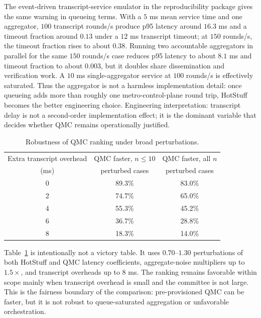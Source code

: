 \documentclass{ieeeaccess}
\begin{document}
The event-driven transcript-service emulator in the reproducibility package gives the same warning in queueing terms. With a $5$ ms mean service time and one aggregator, $100$ transcript rounds/s produce p95 latency around $16.3$ ms and a timeout fraction around $0.13$ under a $12$ ms transcript timeout; at $150$ rounds/s, the timeout fraction rises to about $0.38$. Running two accountable aggregators in parallel for the same $150$ rounds/s case reduces p95 latency to about $8.1$ ms and timeout fraction to about $0.003$, but it doubles share dissemination and verification work. A $10$ ms single-aggregator service at $100$ rounds/s is effectively saturated. Thus the aggregator is not a harmless implementation detail: once queueing adds more than roughly one metro-control-plane round trip, HotStuff becomes the better engineering choice. Engineering interpretation: transcript delay is not a second-order implementation effect; it is the dominant variable that decides whether QMC remains operationally justified.

\begin{table}[!t]
\caption{Robustness of QMC ranking under broad perturbations.}
\label{tab:robust}
\centering
\scriptsize
\setlength{\tabcolsep}{4pt}
\renewcommand{\arraystretch}{1.12}
\begin{tabular}{ccc}
\toprule
Extra transcript overhead & QMC faster, $n\leq 10$ & QMC faster, all $n$ \\
(ms) & perturbed cases & perturbed cases \\
\midrule
0 & 89.3\% & 83.0\% \\
2 & 74.7\% & 65.0\% \\
4 & 55.3\% & 45.2\% \\
6 & 36.7\% & 28.8\% \\
8 & 18.3\% & 14.0\% \\
\bottomrule
\end{tabular}
\end{table}

Table~\ref{tab:robust} is intentionally not a victory table. It uses $0.70$--$1.30$ perturbations of both HotStuff and QMC latency coefficients, aggregate-noise multipliers up to $1.5\times$, and transcript overheads up to $8$ ms. The ranking remains favorable within scope mainly when transcript overhead is small and the committee is not large. This is the fairness boundary of the comparison: pre-provisioned QMC can be faster, but it is not robust to queue-saturated aggregation or unfavorable orchestration.
\end{document}
